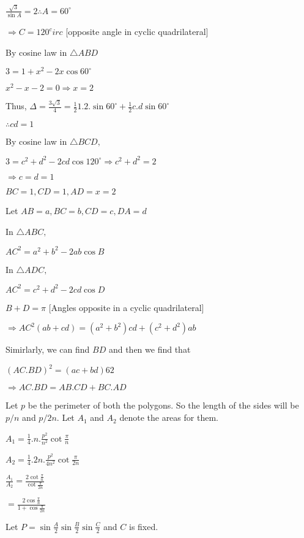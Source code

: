   $\frac{\sqrt{3}}{\sin A} = 2 \therefore A = 60^\circ$

  $\Rightarrow C = 120^circ$ [opposite angle in cyclic quadrilateral]

  By cosine law in $\triangle ABD$

  $3 = 1 + x^2 - 2x\cos60^\circ$

  $x^2 - x - 2 = 0 \Rightarrow x = 2$

  Thus, $\Delta = \frac{3\sqrt{3}}{4} = \frac{1}{2}1.2.\sin60^\circ +
  \frac{1}{2}c.d\sin60^\circ$

  $\therefore cd = 1$

  By cosine law in $\triangle BCD,$

  $3 = c^2 + d^2 - 2cd\cos 120^\circ \Rightarrow c^2 + d^2 = 2$

  $\Rightarrow c = d = 1$

  $BC = 1, CD = 1, AD = x = 2$

\item Let $AB = a, BC = b, CD = c, DA = d$

  In $\triangle ABC,$

  $AC^2 = a^2 + b^2 - 2ab\cos B$

  In $\triangle ADC,$

  $AC^2 = c^2 + d^2 - 2cd\cos D$

  $B + D = \pi$ [Angles opposite in a cyclic quadrilateral]

  $\Rightarrow AC^2(ab + cd) = (a^2 + b^2)cd + (c^2 + d^2)ab$

  Simirlarly, we can find $BD$ and then we find that

  $(AC.BD)^2 = (ac + bd)62$

  $\Rightarrow AC.BD = AB.CD + BC.AD$

\item Let $p$ be the perimeter of both the polygons. So the length of the
  sides will be $p/n$ and $p/2n.$ Let $A_1$ and
  $A_2$ denote the areas for them.

  $A_1 = \frac{1}{4}.n.\frac{p^2}{n^2}\cot\frac{\pi}{n}$

  $A_2 = \frac{1}{4}.2n.\frac{p^2}{4n^2}\cot\frac{\pi}{2n}$

  $\frac{A_1}{A_2} = \frac{2\cot\frac{\pi}{n}}{\cot\frac{\pi}{2n}}$

  $= \frac{2\cos\frac{\pi}{n}}{1 + \cos\frac{\pi}{2n}}$

\item Let $P = \sin\frac{A}{2}\sin\frac{B}{2}\sin\frac{C}{2}$ and $C$ is fixed.

